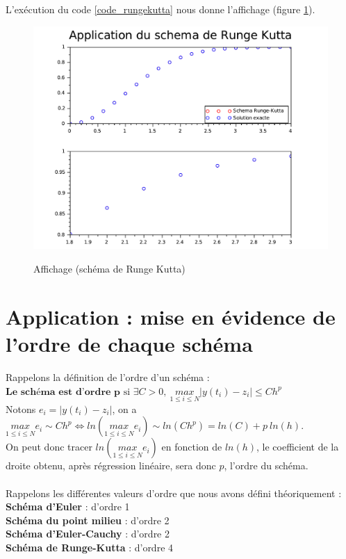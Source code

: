 \documentclass[a4paper,10pt]{report}
\begin{document}
L'exécution du code \ref{code_rungekutta} nous donne l'affichage (figure \ref{graph_rungekutta}).
\begin{figure}[H]
\centering
\caption{Affichage (schéma de Runge Kutta)}
\includegraphics[width=\textwidth]{runge_kutta.pdf}
\label{graph_rungekutta}
\end{figure}

\section{Application : mise en évidence de l'ordre de chaque schéma}
Rappelons la définition de l'ordre d'un schéma :\\
$\textbf{Le schéma est d'ordre p} \text{ si } \exists C > 0, \ \underset{1\leq i \leq N}{max} |y(t_i)-z_i| \leq Ch^p $\\
Notons $e_i=|y(t_i)-z_i|$, on a $\underset{1\leq i \leq N}{max}e_i \sim Ch^p \Leftrightarrow ln(\underset{1\leq i \leq N}{max}e_i) \sim ln(Ch^p) = ln(C) + p\ ln(h)$.\\
On peut donc tracer $ln(\underset{1\leq i \leq N}{max}e_i)$ en fonction de $ln(h)$, le coefficient de la droite obtenu, après régression linéaire, sera donc $p$, l'ordre du schéma.\\ \\
Rappelons les différentes valeurs d'ordre que nous avons défini théoriquement :\\
\textbf{Schéma d'Euler} : d'ordre 1\\
\textbf{Schéma du point milieu} : d'ordre 2\\
\textbf{Schéma d'Euler-Cauchy} : d'ordre 2\\
\textbf{Schéma de Runge-Kutta} : d'ordre 4\\
\end{document}
